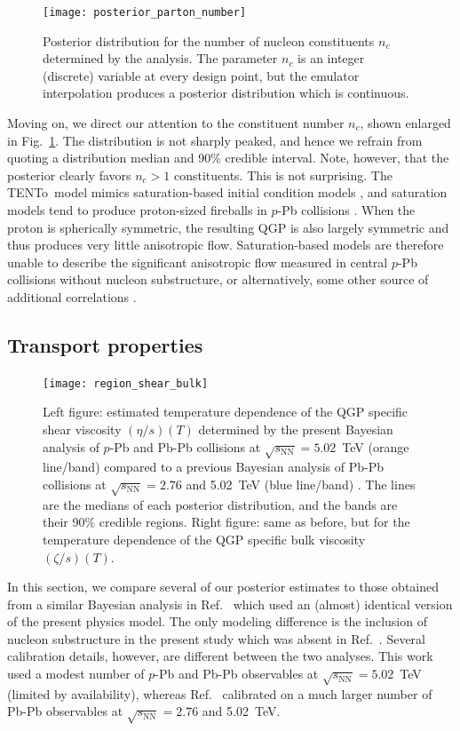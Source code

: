 \documentclass[aps,prc,reprint,amsmath,nofootinbib]{revtex4-1}
\newcommand{\trento}{T\raisebox{-0.5ex}{R}ENTo}
\newcommand{\sqrts}{\sqrt{s_\mathrm{NN}}}
\newcommand{\nc}{n_c}
\begin{document}
\begin{figure}
  \texttt{[image: posterior\_parton\_number]}
  \caption{
    \label{fig:posterior_parton_number}
    Posterior distribution for the number of nucleon constituents $\nc$ determined by the analysis.
    The parameter $\nc$ is an integer (discrete) variable at every design point, but the emulator interpolation produces a posterior distribution which is continuous.
  }
\end{figure}

Moving on, we direct our attention to the constituent number $\nc$, shown enlarged in Fig.~\ref{fig:posterior_parton_number}.
The distribution is not sharply peaked, and hence we refrain from quoting a distribution median and 90\% credible interval.
Note, however, that the posterior clearly favors $\nc > 1$ constituents.
This is not surprising.
The \trento\ model mimics saturation-based initial condition models \cite{Bernhard:2016tnd}, and saturation models tend to produce proton-sized fireballs in $p$-Pb collisions \cite{Bzdak:2013zma}.
When the proton is spherically symmetric, the resulting QGP is also largely symmetric and thus produces very little anisotropic flow.
Saturation-based models are therefore unable to describe the significant anisotropic flow measured in central $p$-Pb collisions without nucleon substructure, or alternatively, some other source of additional correlations \cite{Schenke:2017bog}.

\subsection{Transport properties}

\begin{figure}
  \texttt{[image: region\_shear\_bulk]}
  \caption{
    \label{fig:region_shear_bulk}
    Left figure: estimated temperature dependence of the QGP specific shear viscosity $(\eta/s)(T)$ determined by the present Bayesian analysis of $p$-Pb and Pb-Pb collisions at $\sqrts=5.02$~TeV (orange line/band) compared to a previous Bayesian analysis of Pb-Pb collisions at $\sqrts=2.76$ and 5.02~TeV (blue line/band) \cite{Bernhard:2018hnz}.
    The lines are the medians of each posterior distribution, and the bands are their 90\% credible regions.
    Right figure: same as before, but for the temperature dependence of the QGP specific bulk viscosity $(\zeta/s)(T)$.
  }
\end{figure}

In this section, we compare several of our posterior estimates to those obtained from a similar Bayesian analysis in Ref.~\cite{Bernhard:2018hnz} which used an (almost) identical version of the present physics model.
The only modeling difference is the inclusion of nucleon substructure in the present study which was absent in Ref.~\cite{Bernhard:2018hnz}.
Several calibration details, however, are different between the two analyses.
This work used a modest number of $p$-Pb and Pb-Pb observables at $\sqrts=5.02$~TeV (limited by availability), whereas Ref.~\cite{Bernhard:2018hnz} calibrated on a much larger number of Pb-Pb observables at $\sqrts=2.76$ and 5.02~TeV.
\end{document}
